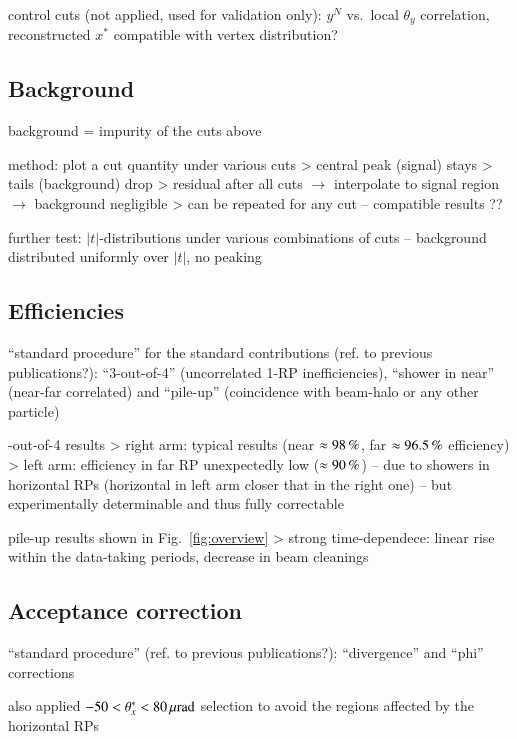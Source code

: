 \> control cuts (not applied, used for validation only): $y^{N}$ vs.~local $\theta_y$ correlation, reconstructed $x^*$ compatible with vertex distribution?


\subsection{Background}

\> background = impurity of the cuts above

\> method: plot a cut quantity under various cuts
\>> central peak (signal) stays
\>> tails (background) drop
\>> residual after all cuts $\rightarrow$ interpolate to signal region $\rightarrow$ background negligible
\>> can be repeated for any cut -- compatible results ??

\> further test: $|t|$-distributions under various combinations of cuts -- background distributed uniformly over $|t|$, no peaking

\subsection{Efficiencies}

\> ``standard procedure'' for the standard contributions (ref. to previous publications?): ``3-out-of-4'' (uncorrelated 1-RP inefficiencies), ``shower in near'' (near-far correlated) and ``pile-up'' (coincidence with beam-halo or any other particle)

-out-of-4 results
\>> right arm: typical results (near $\approx 98\,{\rm \%}$, far $\approx 96.5\,{\rm \%}$ efficiency)
\>> left arm: efficiency in far RP unexpectedly low ($\approx 90\,{\rm \%}$) -- due to showers in horizontal RPs (horizontal in left arm closer that in the right one) -- but experimentally determinable and thus fully correctable

\> pile-up results shown in Fig.~\ref{fig:overview}
\>> strong time-dependece: linear rise within the data-taking periods, decrease in beam cleanings


\subsection{Acceptance correction}

\> ``standard procedure'' (ref. to previous publications?): ``divergence'' and ``phi'' corrections

\> also applied $-50 < \theta_x^* < 80\,{\rm \mu rad}$ selection to avoid the regions affected by the horizontal RPs



